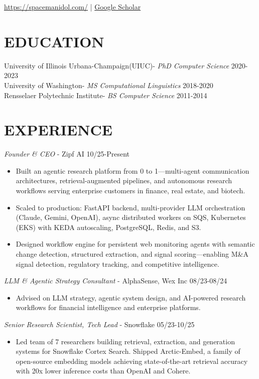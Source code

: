 \documentclass[line,margin]{res}
\begin{document}
\address{\href{mailto:daniel.campos@zipf.ai}{daniel.campos@zipf.ai} }
\href{https://spacemanidol.com/}{https://spacemanidol.com/} | \href{https://scholar.google.com/citations?user=nlHptm8AAAAJ&hl=en}{Google Scholar} 
\begin{resume}
\section{EDUCATION}
University of Illinois Urbana-Champaign(UIUC)- {\sl PhD Computer Science} 2020-2023 \\
University of Washington- {\sl MS Computational Linguistics} 2018-2020 \\
Rensselaer Polytechnic Institute- {\sl BS Computer Science} 2011-2014 
\section{EXPERIENCE}
{\sl Founder \& CEO} - Zipf AI \hfill 10/25-Present
\begin{itemize} \itemsep -4pt
\item Built an agentic research platform from 0 to 1---multi-agent communication architectures, retrieval-augmented pipelines, and autonomous research workflows serving enterprise customers in finance, real estate, and biotech.
\item Scaled to production: FastAPI backend, multi-provider LLM orchestration (Claude, Gemini, OpenAI), async distributed workers on SQS, Kubernetes (EKS) with KEDA autoscaling, PostgreSQL, Redis, and S3.
\item Designed workflow engine for persistent web monitoring agents with semantic change detection, structured extraction, and signal scoring---enabling M\&A signal detection, regulatory tracking, and competitive intelligence.
\end{itemize}
{\sl LLM \& Agentic Strategy Consultant} - AlphaSense, Wex Inc \hfill 08/23-08/24
\begin{itemize} \itemsep -4pt
\item Advised on LLM strategy, agentic system design, and AI-powered research workflows for financial intelligence and enterprise platforms.
\end{itemize}
{\sl Senior Research Scientist, Tech Lead} - Snowflake \hfill 05/23-10/25
\begin{itemize}  \itemsep -4pt 
\item Led team of 7 researchers building retrieval, extraction, and generation systems for Snowflake Cortex Search. Shipped Arctic-Embed, a family of open-source embedding models achieving state-of-the-art retrieval accuracy with 20x lower inference costs than OpenAI and Cohere.

\end{itemize}
\end{resume}
\end{document}

